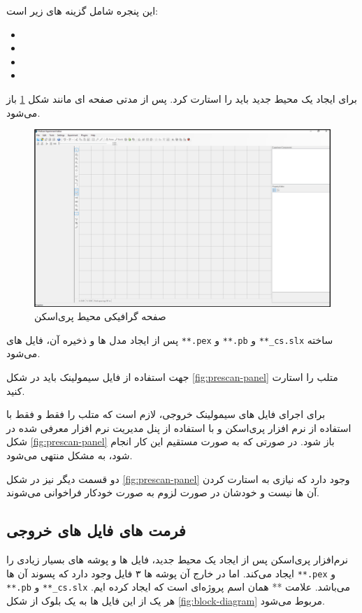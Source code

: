 این پنجره شامل گزینه های زیر است:
\begin{multicols}{2}
\begin{itemize}
	\item {}
	\item {}
	\item {}
	\item {}
\end{itemize}
\end{multicols}

برای ایجاد یک محیط جدید باید  را استارت کرد. پس از مدتی صفحه ای مانند شکل 
\ref{fig:prescan-gui}
باز می‌شود. 





\begin{figure}
	\centering
	\includegraphics[width=0.7\linewidth]{Figures/Prescan-GUI}
	\caption{صفحه گرافیکی محیط پری‌اسکن}
	\label{fig:prescan-gui}
\end{figure}



پس از ایجاد مدل ها و ذخیره آن، فایل های \texttt{**.pex} و \texttt{**.pb} و \texttt{**\_cs.slx} ساخته می‌شود.

جهت استفاده از فایل سیمولینک باید در شکل 
\ref{fig:prescan-panel}
متلب را استارت کنید.
\begin{remark}
	برای اجرای فایل های سیمولینک خروجی، لازم است که متلب را فقط و فقط با استفاده از نرم افزار پری‌اسکن و با استفاده از پنل مدیریت نرم افزار معرفی شده در شکل 
	\ref{fig:prescan-panel}
	باز شود. در صورتی که به صورت مستقیم این کار انجام شود، به مشکل منتهی می‌شود.
\end{remark}


دو قسمت دیگر نیز در شکل 
\ref{fig:prescan-panel}
وجود دارد که نیازی به استارت کردن آن ها نیست و خودشان در صورت لزوم به صورت خودکار فراخوانی می‌شوند.


\subsection{فرمت های فایل های خروجی}
نرم‌افزار پری‌اسکن پس از ایجاد یک محیط جدید، فایل ها و پوشه های بسیار زیادی را ایجاد می‌کند. اما در خارج آن پوشه ها ۳ فایل وجود دارد که پسوند آن ها \texttt{**.pex} و \texttt{**.pb} و \texttt{**\_cs.slx} می‌باشد. علامت ** همان اسم پروژه‌ای است که ایجاد کرده ایم. هر یک از این فایل ها به یک بلوک از شکل 
\ref{fig:block-diagram}
مربوط می‌شود.

